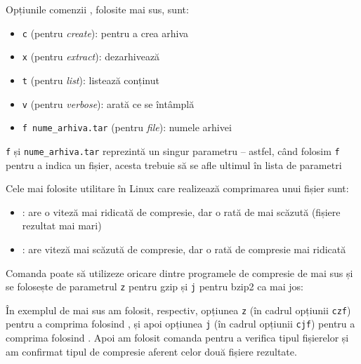 Opțiunile comenzii , folosite mai sus, sunt:
\begin{itemize}
  \item \texttt{c} (pentru \textit{create}): pentru a crea arhiva
  \item \texttt{x} (pentru \textit{extract}): dezarhivează
  \item \texttt{t} (pentru \textit{list}): listează conținut
  \item \texttt{v} (pentru \textit{verbose}): arată ce se întâmplă
  \item \texttt{f nume_arhiva.tar} (pentru \textit{file}): numele arhivei
\end{itemize}

\begin{note}[Observație]
\texttt{f} și \texttt{nume_arhiva.tar} reprezintă un singur parametru – astfel,
când folosim
\texttt{f} pentru a indica un fișier, acesta trebuie să se afle ultimul în lista
de parametri
\end{note}

Cele mai folosite utilitare în Linux care realizează comprimarea unui fișier sunt:

\begin{itemize}
	\item {}: are o viteză mai ridicată de compresie, dar o rată de
          mai scăzută (fișiere rezultat mai mari)
	\item {}: are viteză mai scăzută de compresie, dar o rată de
		compresie mai ridicată
\end{itemize}

Comanda  poate să utilizeze oricare dintre programele de
compresie de mai sus și se folosește de parametrul \texttt{z} pentru gzip și
\texttt{j} pentru bzip2 ca mai jos:


În exemplul de mai sus am folosit, respectiv, opțiunea \texttt{z} (în cadrul opțiunii \texttt{czf}) pentru a comprima folosind , și apoi opțiunea \texttt{j} (în cadrul opțiunii \texttt{cjf}) pentru a comprima folosind . Apoi am folosit comanda  pentru a verifica tipul fișierelor și am confirmat tipul de compresie aferent celor două fișiere rezultate.


